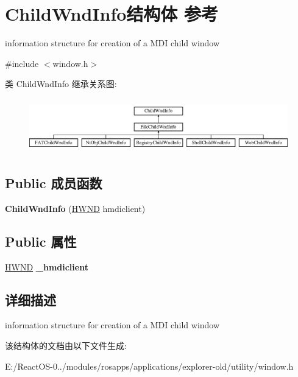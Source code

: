 \hypertarget{struct_child_wnd_info}{}\section{Child\+Wnd\+Info结构体 参考}
\label{struct_child_wnd_info}


information structure for creation of a M\+DI child window  




{\ttfamily \#include $<$window.\+h$>$}

类 Child\+Wnd\+Info 继承关系图\+:\begin{figure}[H]
\begin{center}
\leavevmode
\includegraphics[height=2.382979cm]{struct_child_wnd_info}
\end{center}
\end{figure}
\subsection*{Public 成员函数}
\begin{DoxyCompactItemize}
\item 
\mbox{\label{struct_child_wnd_info_a219278d6e1a4cd7fc681884ebb6ae943}} 
{\bfseries Child\+Wnd\+Info} (\hyperlink{interfacevoid}{H\+W\+ND} hmdiclient)
\end{DoxyCompactItemize}
\subsection*{Public 属性}
\begin{DoxyCompactItemize}
\item 
\mbox{\label{struct_child_wnd_info_a11429e4ff0d9f3241fb6d2b76a267b10}} 
\hyperlink{interfacevoid}{H\+W\+ND} {\bfseries \+\_\+hmdiclient}
\end{DoxyCompactItemize}


\subsection{详细描述}
information structure for creation of a M\+DI child window 

该结构体的文档由以下文件生成\+:\begin{DoxyCompactItemize}
\item 
E\+:/\+React\+O\+S-\/0../modules/rosapps/applications/explorer-\/old/utility/window.\+h\end{DoxyCompactItemize}
